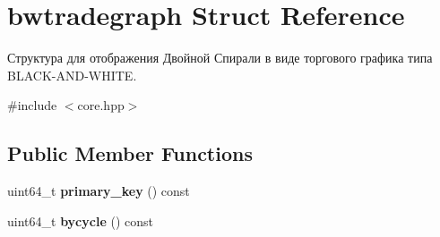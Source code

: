 \hypertarget{structbwtradegraph}{}\section{bwtradegraph Struct Reference}
\label{structbwtradegraph}


Структура для отображения Двойной Спирали в виде торгового графика типа B\+L\+A\+C\+K-\/\+A\+N\+D-\/\+W\+H\+I\+TE.  




{\ttfamily \#include $<$core.\+hpp$>$}

\subsection*{Public Member Functions}
\begin{DoxyCompactItemize}
\item 
\mbox{\label{structbwtradegraph_a19590e9b3e4adbd376cdf46c1eacc87c}} 
uint64\+\_\+t {\bfseries primary\+\_\+key} () const
\item 
\mbox{\label{structbwtradegraph_a978bf2b0e04ef88c0370b3989fe85e73}} 
uint64\+\_\+t {\bfseries bycycle} () const
\end{DoxyCompactItemize}
